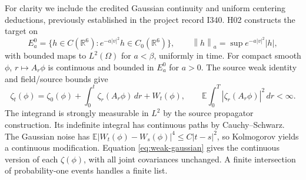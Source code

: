 \documentclass[11pt]{article}
\newcommand{\R}{\mathbb R}
\newcommand{\E}{\mathbb E}
\newcommand{\dd}{\,d}
\newcommand{\norm}[1]{\left\|#1\right\|}
\theoremstyle{definition}\newtheorem{definition}[theorem]{Definition}
\theoremstyle{remark}\newtheorem{remark}[theorem]{Remark}
\numberwithin{equation}{section}
\begin{document}
For clarity we include the credited Gaussian continuity and uniform
centering deductions, previously established in the project record I340.
H02 constructs the target on
\[
 E_a^0=\{h\in C(\R^6):e^{-a|v|^2}h\in C_0(\R^6)\},
 \qquad \norm h_a=\sup e^{-a|v|^2}|h|,
\]
with bounded maps to $L^2(\Omega)$ for $a<\beta$, uniformly in time.
For compact smooth $\phi$, $r\mapsto A_r\phi$ is continuous and bounded
in $E_a^0$ for $a>0$. The source weak identity and field/source bounds give
\begin{equation}\label{eq:weak-gaussian}
 \zeta_t(\phi)=\zeta_0(\phi)+\int_0^t\zeta_r(A_r\phi)\dd r+W_t(\phi),
 \qquad
 \E\int_0^T|\zeta_r(A_r\phi)|^2\dd r<\infty.
\end{equation}
The integrand is strongly measurable in $L^2$ by the source propagator
construction. Its indefinite integral has continuous paths by
Cauchy--Schwarz. The Gaussian noise has
$\E|W_t(\phi)-W_s(\phi)|^4\le C|t-s|^2$, so Kolmogorov yields a continuous
modification. Equation \eqref{eq:weak-gaussian} gives the continuous version
of each $\zeta(\phi)$, with all joint covariances unchanged. A finite
intersection of probability-one events handles a finite list.
\end{document}
